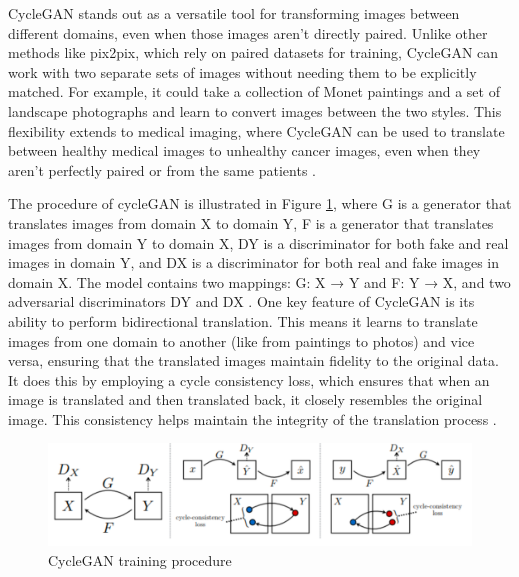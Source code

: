 \documentclass[UKenglish,12pt]{master-style}
\begin{document}
CycleGAN stands out as a versatile tool for transforming images between different domains, even when those images aren't directly paired. Unlike other methods like pix2pix, which rely on paired datasets for training, CycleGAN can work with two separate sets of images without needing them to be explicitly matched. For example, it could take a collection of Monet paintings and a set of landscape photographs and learn to convert images between the two styles. This flexibility extends to medical imaging, where CycleGAN can be used to translate between healthy medical images to unhealthy cancer images, even when they aren't perfectly paired or from the same patients \cite{unpaired_horse2zebra_cyclgan} .

The procedure of cycleGAN is illustrated in Figure \ref{fig:cyclegan}, where G is a generator that translates images
from domain X to domain Y, F is a generator that translates images from domain Y to domain X, DY is a discriminator for both fake and real images in domain Y, and DX is a discriminator for both real and fake images in domain X. The model contains two mappings: G: X → Y and F: Y → X, and two adversarial discriminators DY and DX \cite{unpaired_horse2zebra_cyclgan}. One key feature of CycleGAN is its ability to perform bidirectional translation. This means it learns to translate images from one domain to another (like from paintings to photos) and vice versa, ensuring that the translated images maintain fidelity to the original data. It does this by employing a cycle consistency loss, which ensures that when an image is translated and then translated back, it closely resembles the original image. This consistency helps maintain the integrity of the translation process \cite{unpaired_horse2zebra_cyclgan} .

\begin{figure}[htbp]
    \centering
    \includegraphics[width=1\textwidth]{Images/cyclegan.png}
    \caption{CycleGAN training procedure}
    \label{fig:cyclegan}
\end{figure}
\end{document}
